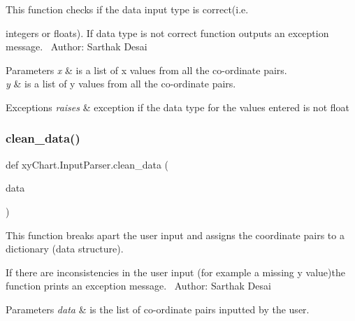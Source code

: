 This function checks if the data input type is correct(i.\+e. 

integers or floats). If data type is not correct function outputs an exception message.~\newline
 Author\+: Sarthak Desai~\newline

\begin{DoxyParams}{Parameters}
{\em x} & is a list of x values from all the co-\/ordinate pairs. \\
\hline
{\em y} & is a list of y values from all the co-\/ordinate pairs. \\
\hline
\end{DoxyParams}

\begin{DoxyExceptions}{Exceptions}
{\em raises} & exception if the data type for the values entered is not float \\
\hline
\end{DoxyExceptions}
\hypertarget{namespacexy_chart_1_1_input_parser_a191949c9ebdf33fe93b75b8a82f222e5}{}\label{namespacexy_chart_1_1_input_parser_a191949c9ebdf33fe93b75b8a82f222e5} 
\subsubsection{\texorpdfstring{clean\+\_\+data()}{clean\_data()}}
{\footnotesize\ttfamily def xy\+Chart.\+Input\+Parser.\+clean\+\_\+data (\begin{DoxyParamCaption}\item[{}]{data }\end{DoxyParamCaption})}



This function breaks apart the user input and assigns the coordinate pairs to a dictionary (data structure). 

If there are inconsistencies in the user input (for example a missing y value)the function prints an exception message.~\newline
 Author\+: Sarthak Desai~\newline

\begin{DoxyParams}{Parameters}
{\em data} & is the list of co-\/ordinate pairs inputted by the user. \\
\hline
\end{DoxyParams}

